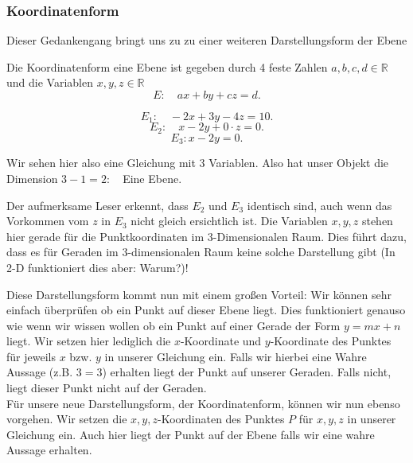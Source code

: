 \documentclass[a4paper,12pt]{article}
\newcommand{\Definition}[2]{
	{
		\vspace*{0.1cm}
		\begin{tcolorbox}[breakable,colback=yellow!0,colframe=black!40!red,title=\textbf{Definition #1:},width=\linewidth ]
			{#2}
		\end{tcolorbox}
		
		
	}
}
\newcommand{\Bemerkung}[1]{
	\vspace*{0.3cm}
	\begin{tcolorbox}[breakable,colback=yellow!10,colframe=yellow!65!black,title=\textbf{Bemerkung:},width=\linewidth ]
		{#1}
	\end{tcolorbox}
}
\newcommand{\Beispiel}[1]{
	\vspace*{0.2cm}
	\begin{tcolorbox}[breakable,colback=yellow!0,colframe=green!65!black,title=\textbf{Beispiel:},width=\linewidth ]
		{#1}
	\end{tcolorbox}
}
\begin{document}
	\subsubsection{Koordinatenform}
		Dieser Gedankengang bringt uns zu zu einer weiteren Darstellungsform der Ebene
		\Definition{Koordinatenform}{
			Die Koordinatenform eine Ebene ist gegeben durch 4 feste Zahlen $a,b,c,d\in \mathds{R}$ 
			und die Variablen $x,y,z\in \mathds{R}$ {\LARGE\[
			E: \quad ax + by + cz = d
	.\] }\vspace*{0.1cm}
		}
		\Beispiel{
			\[
			E_1:\quad -2x + 3y - 4z = 10 
			.\] 
			\[
			E_2: \quad x - 2y + 0\cdot z = 0 
			.\]
			\[
			E_3 : x - 2y = 0
			.\] 

		}
		Wir sehen hier also eine Gleichung mit 3 Variablen. Also hat unser Objekt die Dimension 
		$3-1=2:\quad$Eine Ebene.\\
		\Bemerkung{
		Der aufmerksame Leser erkennt, dass $E_2$ und  $E_3$ identisch sind, auch wenn das Vorkommen
		vom  $z$ in  $E_3$ nicht gleich ersichtlich ist. Die Variablen $x,y,z$ stehen hier gerade
		für die Punktkoordinaten im 3-Dimensionalen Raum. Dies führt dazu, dass es für Geraden im
		3-dimensionalen Raum keine solche Darstellung gibt (In 2-D funktioniert dies aber: Warum?)!  
		}
		Diese Darstellungsform kommt nun mit einem großen Vorteil: Wir können sehr einfach überprüfen ob ein 
		Punkt auf dieser Ebene liegt. Dies funktioniert genauso wie wenn wir wissen wollen ob ein Punkt auf 
		einer Gerade der Form $y=mx+n$ liegt. Wir setzen hier lediglich die  $x$-Koordinate und 
		$y$-Koordinate des Punktes für jeweils  $x$ bzw.  $y$ in unserer Gleichung ein. Falls wir hierbei 
		eine Wahre Aussage (z.B. $3=3$) erhalten liegt der Punkt auf unserer Geraden. Falls nicht, liegt 
		dieser Punkt nicht auf der Geraden.\\
		Für unsere neue Darstellungsform, der Koordinatenform, können wir nun ebenso vorgehen. Wir setzen 
		 die $x,y,z$-Koordinaten des Punktes  $P$ für  $x,y,z$ in unserer Gleichung ein.
		Auch hier liegt der Punkt auf der Ebene falls wir eine wahre Aussage erhalten.
\end{document}

